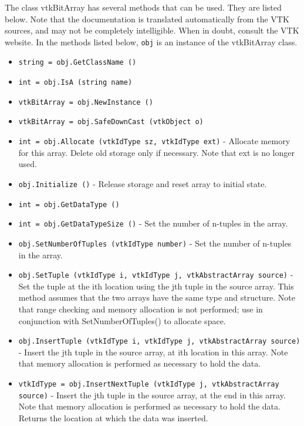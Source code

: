 The class vtkBitArray has several methods that can be used.
  They are listed below.
Note that the documentation is translated automatically from the VTK sources,
and may not be completely intelligible.  When in doubt, consult the VTK website.
In the methods listed below, \verb|obj| is an instance of the vtkBitArray class.
\begin{itemize}
\item  \verb|string = obj.GetClassName ()|

\item  \verb|int = obj.IsA (string name)|

\item  \verb|vtkBitArray = obj.NewInstance ()|

\item  \verb|vtkBitArray = obj.SafeDownCast (vtkObject o)|

\item  \verb|int = obj.Allocate (vtkIdType sz, vtkIdType ext)| -  Allocate memory for this array. Delete old storage only if necessary.
 Note that ext is no longer used.

\item  \verb|obj.Initialize ()| -  Release storage and reset array to initial state.

\item  \verb|int = obj.GetDataType ()|

\item  \verb|int = obj.GetDataTypeSize ()| -  Set the number of n-tuples in the array.

\item  \verb|obj.SetNumberOfTuples (vtkIdType number)| -  Set the number of n-tuples in the array.

\item  \verb|obj.SetTuple (vtkIdType i, vtkIdType j, vtkAbstractArray source)| -  Set the tuple at the ith location using the jth tuple in the source array.
 This method assumes that the two arrays have the same type
 and structure. Note that range checking and memory allocation is not 
 performed; use in conjunction with SetNumberOfTuples() to allocate space.

\item  \verb|obj.InsertTuple (vtkIdType i, vtkIdType j, vtkAbstractArray source)| -  Insert the jth tuple in the source array, at ith location in this array. 
 Note that memory allocation is performed as necessary to hold the data.

\item  \verb|vtkIdType = obj.InsertNextTuple (vtkIdType j, vtkAbstractArray source)| -  Insert the jth tuple in the source array, at the end in this array. 
 Note that memory allocation is performed as necessary to hold the data.
 Returns the location at which the data was inserted.


\end{itemize}
